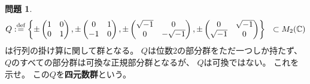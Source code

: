 \documentclass[uplatex]{jsreport}
\theoremstyle{definition}
\newtheorem{prob}[prob]{問題}
\newcommand{\dfn}{:\overset{\mbox{{\scriptsize def}}}{=}}
\newcommand{\C}{\mathbb{C}}
\begin{document}
\begin{prob}
  \[
  Q\dfn \left\{
  \pm
  \begin{pmatrix}
    1 & 0 \\
    0 & 1 \\
  \end{pmatrix},
  \pm
  \begin{pmatrix}
    0 & 1 \\
    -1 & 0 \\
  \end{pmatrix},
  \pm
  \begin{pmatrix}
    \sqrt{-1} & 0 \\
    0 & -\sqrt{-1} \\
  \end{pmatrix},
  \pm
  \begin{pmatrix}
    0 & \sqrt{-1} \\
    \sqrt{-1} & 0 \\
  \end{pmatrix}
  \right\} \ \ \subset M_2(\C)
  \]
  は行列の掛け算に関して群となる。
  \(Q\)は位数\(2\)の部分群をただ一つしか持たず、
  \(Q\)のすべての部分群は可換な正規部分群となるが、
  \(Q\)は可換ではない。
  これを示せ。
  この\(Q\)を\textbf{四元数群}という。
\end{prob}
\end{document}
